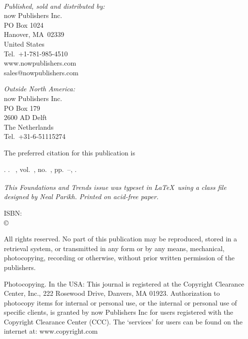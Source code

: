 {\begin{titlepage}
\parskip6pt

{\bfseries\sffamily\Large \@journaltitleprefix\ \@journaltitle}
\footnotesize

\vfill

{\itshape Published, sold and distributed by:}\\
now Publishers Inc.\\
PO Box 1024\\
Hanover, MA\ 02339\\
United States\\
Tel.\ +1-781-985-4510\\
www.nowpublishers.com\\
sales@nowpublishers.com

{\itshape Outside North America:}\\
now Publishers Inc.\\
PO Box 179\\
2600 AD Delft\\
The Netherlands\\
Tel.\ +31-6-51115274

The preferred citation for this publication is

{\raggedright
\@copyrightowner. \emph{\@title}.  \@journaltitleprefix\
\@journaltitle, vol.~\@volume, no.~\@issue, pp.~\@firstpage--\@lastpage,
\@pubyear.\par}

{\itshape This Foundations and Trends\textsuperscript{\textregistered} issue
was typeset in \LaTeX\ using a class file designed by Neal Parikh. Printed on
acid-free paper.}

ISBN: \@isbn\\ \copyright\ \@copyrightyear\ \@copyrightowner

\vfill

\fontsize{8}{9}\selectfont
All rights reserved. No part of this publication may be
reproduced, stored in a retrieval system, or transmitted in any form
or by any means, mechanical, photocopying, recording or otherwise,
without prior written permission of the publishers.

Photocopying. In the USA: This journal is registered at the Copyright
Clearance Center, Inc., 222 Rosewood Drive, Danvers, MA 01923. 
Authorization to photocopy items for
internal or personal use, or the internal or personal use of specific
clients, is granted by now Publishers Inc for users registered with 
the Copyright Clearance Center (CCC).
The `services' for users can be found on the internet at:
www.copyright.com


\end{titlepage}}
